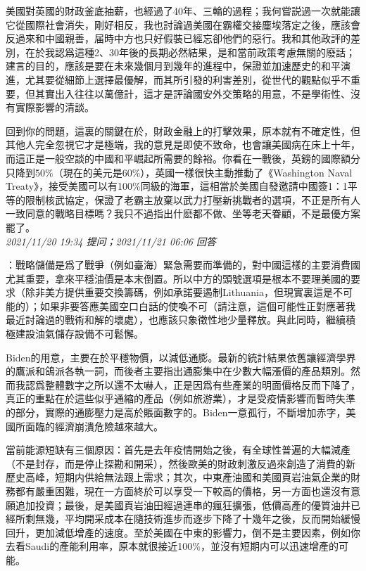 \documentclass[twocolumn]{ctexart}
\begin{document}
美國對英國的財政釜底抽薪，也經過了40年、三輪的過程；我何嘗説過一次就能讓它從國際社會消失，剛好相反，我也討論過美國在霸權交接塵埃落定之後，應該會反過來和中國親善，届時中方也只好假裝已經忘卻他們的惡行。我和其他政評的差別，在於我認爲這種2、30年後的長期必然結果，是和當前政策考慮無關的廢話；建言的目的，應該是要在未來幾個月到幾年的進程中，保證並加速歷史的和平演進，尤其要從細節上選擇最優解，而其所引發的利害差別，從世代的觀點似乎不重要，但其實出入往往以萬億計，這才是評論國安外交策略的用意，不是學術性、沒有實際影響的清談。

回到你的問題，這裏的關鍵在於，財政金融上的打擊效果，原本就有不確定性，但其他人完全忽視它才是極端，我的意見是即使不致命，也會讓美國病在床上十年，而這正是一般空談的中國和平崛起所需要的餘裕。你看在一戰後，英鎊的國際額分只降到50\%（現在的美元是60\%），英國一樣很快主動推動了《Washington Naval Treaty》，接受美國可以有100\%同級的海軍，這相當於美國自發邀請中國簽1：1平等的限制核武協定，保證了老霸主放棄以武力打壓新挑戰者的選項，不正是所有人一致同意的戰略目標嗎？我只不過指出什麽都不做、坐等老天眷顧，不是最優方案罷了。
\\

\textit{\hfill\noindent\small 2021/11/20 19:34 提问；2021/11/21 06:06 回答}

：戰略儲備是爲了戰爭（例如臺海）緊急需要而準備的，對中國這樣的主要消費國尤其重要，拿來平穩油價是本末倒置。所以中方的頭號選項是根本不要理美國的要求（除非美方提供重要交換籌碼，例如承諾要遏制Lithuania，但現實裏這是不可能的）；如果非要答應美國空口白話的使喚不可（請注意，這個可能性正對應著我最近討論過的戰術和解的壞處），也應該只象徵性地少量釋放。與此同時，繼續積極建設油氣儲存設備不可鬆懈。

Biden的用意，主要在於平穩物價，以減低通膨。最新的統計結果依舊讓經濟學界的鷹派和鴿派各執一詞，而後者主要指出通膨集中在少數大幅漲價的產品類別。然而我認爲整體數字之所以還不太嚇人，正是因爲有些產業的明面價格反而下降了，真正的重點在於這些似乎通縮的產品（例如旅游業），才是受疫情影響而暫時失準的部分，實際的通膨壓力是高於賬面數字的。Biden一意孤行，不斷增加赤字，美國所面臨的經濟崩潰危險越來越大。

當前能源短缺有三個原因：首先是去年疫情開始之後，有全球性普遍的大幅減產（不是封存，而是停止探勘和開采），然後歐美的財政刺激反過來創造了消費的新歷史高峰，短期内供給無法跟上需求；其次，中東產油國和美國頁岩油氣企業的財務都有嚴重困難，現在一方面終於可以享受一下較高的價格，另一方面也還沒有意願追加投資；最後，是美國頁岩油田經過連串的瘋狂擴張，低價高產的優質油井已經所剩無幾，平均開采成本在隨技術進步而逐步下降了十幾年之後，反而開始緩慢回升，更加減低增產的速度。至於美國在中東的影響力，倒不是主要因素，例如你去看Saudi的產能利用率，原本就很接近100\%，並沒有短期内可以迅速增產的可能。
\\
\end{document}
